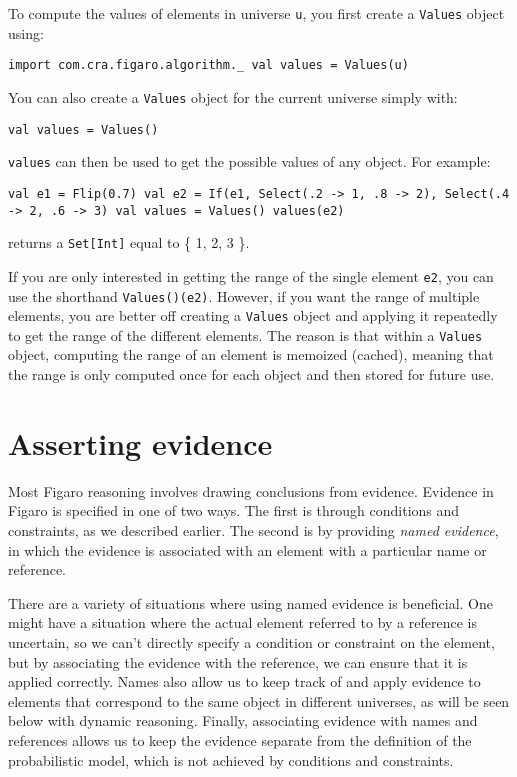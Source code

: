 To compute the values of elements in universe \texttt{u}, you first create a \texttt{Values} object using:

\begin{flushleft}
\texttt{import com.cra.figaro.algorithm.\_
\newline val values = Values(u)}
\end{flushleft}

You can also create a \texttt{Values} object for the current universe simply with:

\begin{flushleft}
\texttt{val values = Values()}
\end{flushleft}

\texttt{values} can then be used to get the possible values of any object. For example:

\begin{flushleft}
\texttt{val e1 = Flip(0.7)
\newline val e2 = If(e1, Select(.2 -> 1, .8 -> 2), Select(.4 -> 2, .6 -> 3)
\newline val values = Values()
\newline values(e2)}
\end{flushleft}

returns a \texttt{Set[Int]} equal to \{ 1, 2, 3 \}.

If you are only interested in getting the range of the single element \texttt{e2}, you can use the shorthand \texttt{Values()(e2)}. However, if you want the range of multiple elements, you are better off creating a \texttt{Values} object and applying it repeatedly to get the range of the different elements. The reason is that within a \texttt{Values} object, computing the range of an element is memoized (cached), meaning that the range is only computed once for each object and then stored for future use.

\section{Asserting evidence}

Most Figaro reasoning involves drawing conclusions from evidence. Evidence in Figaro is specified in one of two ways. The first is through conditions and constraints, as we described earlier. The second is by providing \emph{named evidence}, in which the evidence is associated with an element with a particular name or reference.

There are a variety of situations where using named evidence is beneficial. One might have a situation where the actual element referred to by a reference is uncertain, so we can't directly specify a condition or constraint on the element, but by associating the evidence with the reference, we can ensure that it is applied correctly. Names also allow us to keep track of and apply evidence to elements that correspond to the same object in different universes, as will be seen below with dynamic reasoning. Finally, associating evidence with names and references allows us to keep the evidence separate from the definition of the probabilistic model, which is not achieved by conditions and constraints.

